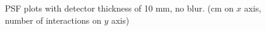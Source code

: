 \documentclass[a4paper]{article}
\begin{document}
\begin{figure}[H]
  \caption{PSF plots with detector thickness of 10 mm, no blur. (cm on $x$ axis, number of interactions on $y$ axis)}
  \label{fig:100_xs}
\end{figure}
\end{document}
